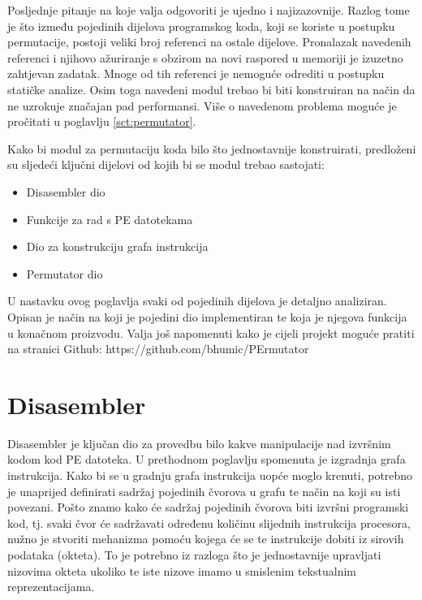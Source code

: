 \documentclass[times, utf8, diplomski, numeric]{fer}
\begin{document}
Posljednje pitanje na koje valja odgovoriti je ujedno i
najizazovnije. Razlog tome je što između pojedinih dijelova
programskog koda, koji se koriste u postupku permutacije, postoji
veliki broj referenci na ostale dijelove. Pronalazak navedenih
referenci i njihovo ažuriranje s obzirom na novi raspored u
memoriji je izuzetno zahtjevan zadatak. Mnoge od tih referenci je
nemoguće odrediti u postupku statičke analize. Osim toga navedeni
modul trebao bi biti konstruiran na način da ne uzrokuje značajan
pad performansi. Više o navedenom problema moguće je pročitati u
poglavlju \ref{sct:permutator}.

Kako bi modul za permutaciju koda bilo što jednostavnije
konstruirati, predloženi su sljedeći ključni dijelovi od kojih bi
se modul trebao sastojati:

\begin{itemize}
\item Disasembler dio
\item Funkcije za rad s PE datotekama
\item Dio za konstrukciju grafa instrukcija
\item Permutator dio
\end{itemize}

U nastavku ovog poglavlja svaki od pojedinih dijelova je detaljno
analiziran. Opisan je način na koji je pojedini dio implementiran
te koja je njegova funkcija u konačnom proizvodu. Valja još
napomenuti kako je cijeli projekt moguće pratiti na stranici
Github: https://github.com/bhumic/PErmutator

\pagebreak

\section{Disasembler}

Disasembler je ključan dio za provedbu bilo kakve manipulacije
nad izvršnim kodom kod PE datoteka. U prethodnom poglavlju
spomenuta je izgradnja grafa instrukcija. Kako bi se u gradnju
grafa instrukcija uopće moglo krenuti, potrebno je unaprijed
definirati sadržaj pojedinih čvorova u grafu te način na koji su
isti povezani. Pošto znamo kako će sadržaj pojedinih čvorova biti
izvršni programski kod, tj. svaki čvor će sadržavati određenu
količinu slijednih instrukcija procesora, nužno je stvoriti
mehanizma pomoću kojega će se te instrukcije dobiti iz sirovih
podataka (okteta). To je potrebno iz razloga što je jednostavnije
upravljati nizovima okteta ukoliko te iste nizove imamo u
smislenim tekstualnim reprezentacijama.
\end{document}
